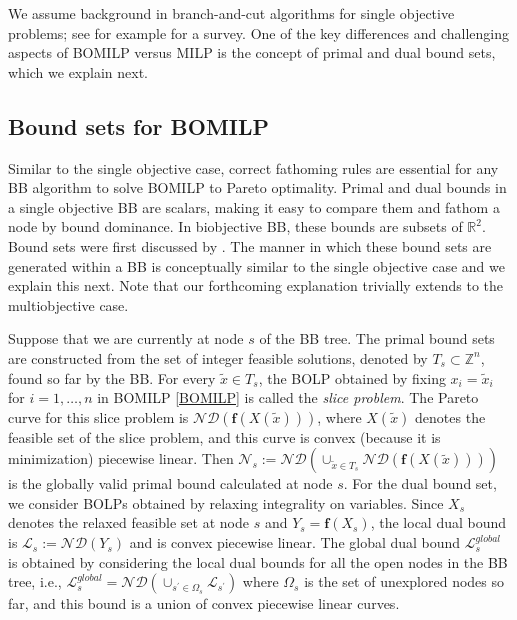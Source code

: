 \documentclass[11.5pt]{article}
\newcommand{\bb}{BB}
\newcommand{\R}{\mathbb{R}}
\newcommand{\Z}{\mathbb{Z}}
\renewcommand{\L}{\mathcal{L}}
\newcommand{\N}{\mathcal{N}}
\newcommand{\objf}{\boldsymbol{f}}
\newcommand{\nd}[1]{\mathcal{ND}(#1)}
\begin{document}
We assume background in branch-and-cut algorithms for single objective problems; see for example \citet{martin2001general} for a survey. One of the key differences and challenging aspects of BOMILP versus MILP is the concept of primal and dual bound sets, which we explain next.

{
\newcommand{\Pareto}[1]{\mathcal{P}(#1)}
\subsection{Bound sets for BOMILP}\label{sec:bounds}
Similar to the single objective case, correct fathoming rules are essential for any \bb{} algorithm to solve BOMILP to Pareto optimality. Primal and dual bounds in a single objective \bb{} are scalars, making it easy to compare them and fathom a node by bound dominance. In biobjective BB, these bounds are subsets of $\R^{2}$. Bound sets were first discussed by \citet{ehrgott2007bound}. The manner in which these bound sets are generated within a \bb{} is conceptually similar to the single objective case and we explain this next. Note that our forthcoming explanation trivially extends to the multiobjective case. 

Suppose that we are currently at node $s$ of the \bb{} tree. The primal bound sets are constructed from the set of integer feasible solutions, denoted by $T_{s}\subset\Z^{n}$, found so far by the \bb{}. %
For every $\tilde{x}\in T_{s}$, the BOLP obtained by fixing $x_{i}=\tilde{x}_{i}$ for $i=1,\dots,n$ in BOMILP \eqref{BOMILP} is called the \emph{slice problem}. The Pareto curve for this slice problem is $\nd{\objf(X(\tilde{x}))}$, where $X(\tilde{x})$ denotes the feasible set of the slice problem, and this curve is convex (because it is minimization) piecewise linear. Then $\N_{s} := \displaystyle\nd{\cup_{\tilde{x}\in T_{s}}\nd{\objf(X(\tilde{x}))}}$ is the globally valid primal bound calculated at node $s$. For the dual bound set, we consider BOLPs obtained by relaxing integrality on variables. Since $X_{s}$ denotes the relaxed feasible set at node $s$ and $Y_{s}=\objf(X_{s})$, the local dual bound is $\L_{s} := \nd{Y_{s}}$ and is convex piecewise linear. The global dual bound $\L^{global}_{s}$ is obtained by considering the local dual bounds for all the open nodes in the \bb{} tree, i.e., $\L^{global}_{s} = \nd{\cup_{s^{\prime}\in\Omega_{s}}\L_{s^{\prime}}}$ where $\Omega_{s}$ is the set of unexplored nodes so far, and this bound is a union of convex piecewise linear curves.

}
\end{document}

